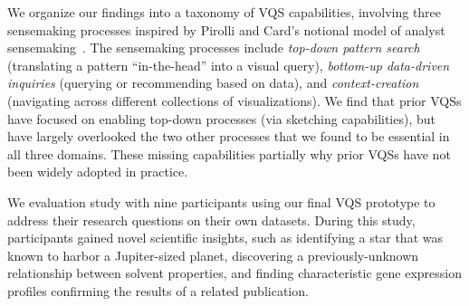  \par We organize our  findings into a taxonomy of VQS capabilities, involving three sensemaking processes inspired by Pirolli and Card's notional model of analyst sensemaking~\cite{Pirolli}. The sensemaking processes include \emph{top-down pattern search} (translating a pattern ``in-the-head'' into a visual query), \emph{bottom-up data-driven inquiries} (querying or recommending based on data), and \emph{context-creation} (navigating across different collections of visualizations). We find that prior VQSs have focused on enabling top-down processes (via sketching capabilities), but have largely overlooked the two other processes that we found to be essential in all three domains. These missing capabilities partially  why prior VQSs have not been widely adopted in practice.
 \par We  evaluation study with nine participants using our final VQS prototype to address their research questions on their own datasets. During this study, participants gained novel scientific insights,
 such as identifying a star that was known to harbor a Jupiter-sized planet, discovering a previously-unknown relationship between solvent properties, and finding characteristic gene expression profiles confirming the results of a related publication. %
